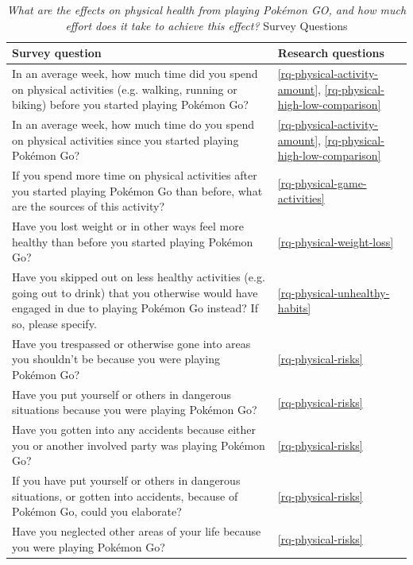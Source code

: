 \begin{table}[h]
\caption{\emph{What are the effects on physical health from playing Pokémon GO, and how much effort does it take to achieve this effect?} Survey Questions}
\centering
\label{tbl:rg2-survey-questions}
	\begin{tabularx}{\textwidth}{|X|l|}
		\hline
		\textbf{Survey question} & \textbf{Research questions}\\
		\hline\hline
		
		In an average week, how much time did you spend on physical activities (e.g. walking, running or biking) before you started playing Pokémon Go? & \ref{rq-physical-activity-amount}, \ref{rq-physical-high-low-comparison}\\
		\hline
		
		In an average week, how much time do you spend on physical activities since you started playing Pokémon Go? & \ref{rq-physical-activity-amount}, \ref{rq-physical-high-low-comparison}\\
		\hline
		
		If you spend more time on physical activities after you started playing Pokémon Go than before, what are the sources of this activity? & \ref{rq-physical-game-activities}\\
		\hline
		
		Have you lost weight or in other ways feel more healthy than before you started playing Pokémon Go? & \ref{rq-physical-weight-loss}\\
		\hline
		
		Have you skipped out on less healthy activities (e.g. going out to drink) that you otherwise would have engaged in due to playing Pokémon Go instead? If so, please specify. & \ref{rq-physical-unhealthy-habits}\\
		\hline
		
		Have you trespassed or otherwise gone into areas you shouldn’t be because you were playing Pokémon Go? & \ref{rq-physical-risks}\\
		\hline
		
		Have you put yourself or others in dangerous situations because you were playing Pokémon Go? & \ref{rq-physical-risks}\\
		\hline
		
		Have you gotten into any accidents because either you or another involved party was playing Pokémon Go? & \ref{rq-physical-risks}\\
		\hline
		
		If you have put yourself or others in dangerous situations, or gotten into accidents, because of Pokémon Go, could you elaborate? & \ref{rq-physical-risks}\\
		\hline
		
		Have you neglected other areas of your life because you were playing Pokémon Go? & \ref{rq-physical-risks}\\
		\hline
	\end{tabularx}
\end{table}

